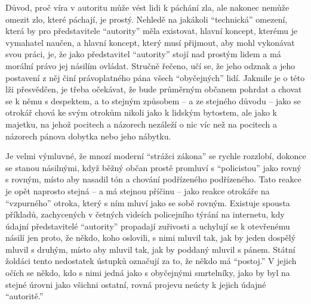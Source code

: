 \documentclass{book}
\begin{document}
Důvod, proč víra v autoritu může vést lidi k páchání zla, ale nakonec nemůže omezit zlo, které páchají, je prostý. Nehledě na jakákoli \enquote{technická} omezení, která by pro představitele \enquote{autority} měla existovat, hlavní koncept, kterému je vymahatel naučen, a hlavní koncept, který musí přijmout, aby mohl vykonávat svou práci, je, že jako představitel \enquote{autority} stojí nad prostým lidem a má morální právo jej násilím ovládat. Stručně řečeno, učí se, že jeho odznak a jeho postavení z něj činí právoplatného pána všech \enquote{obyčejných} lidí. Jakmile je o této lži přesvědčen, je třeba očekávat, že bude průměrným občanem pohrdat a chovat se k němu s despektem, a to stejným způsobem -- a ze stejného důvodu -- jako se otrokář chová ke svým otrokům nikoli jako k lidským bytostem, ale jako k majetku, na jehož pocitech a názorech nezáleží o nic víc než na pocitech a názorech pánova dobytka nebo jeho nábytku.

Je velmi výmluvné, že mnozí moderní \enquote{strážci zákona} se rychle rozzlobí, dokonce se stanou násilnými, když běžný občan prostě promluví s \enquote{policistou} jako rovný s rovným, místo aby nasadil tón a chování podřízeného podřízeného. Tato reakce je opět naprosto stejná -- a má stejnou příčinu -- jako reakce otrokáře na \enquote{vzpurného} otroka, který s ním mluví jako se sobě rovným. Existuje spousta příkladů, zachycených v četných videích policejního týrání na internetu, kdy údajní představitelé \enquote{autority} propadají zuřivosti a uchylují se k otevřenému násilí jen proto, že někdo, koho oslovili, s nimi mluvil tak, jak by jeden dospělý mluvil s druhým, místo aby mluvil tak, jak by poddaný mluvil s pánem. Státní žoldáci tento nedostatek ústupků označují za to, že někdo má \enquote{postoj.} V jejich očích se někdo, kdo s nimi jedná jako s obyčejnými smrtelníky, jako by byl na stejné úrovni jako všichni ostatní, rovná projevu neúcty k jejich údajné \enquote{autoritě.}
\end{document}

